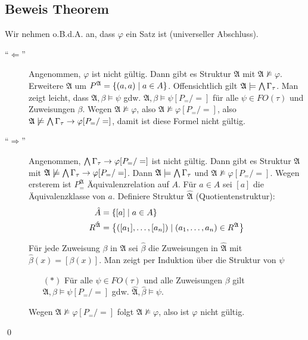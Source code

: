 \subsection{Beweis Theorem}

Wir nehmen o.B.d.A. an, dass $\varphi$ ein Satz ist (universeller Abschluss).

\begin{description}
  \item[\enquote{$\Leftarrow$}]
  Angenommen, $\varphi$ ist nicht gültig. Dann gibt es Struktur $\mathfrak{A}$ mit $\mathfrak{A}\not\models\varphi$.
  Erweitere $\mathfrak{A}$ um $P^\mathfrak{A} = \left\{(a,a)\mid a\in A\right\}$.
  Offensichtlich gilt $\mathfrak{A}\models\operatorname*{\bigwedge}\Gamma_\tau$. Man zeigt leicht, dass $\mathfrak{A},\beta\models\psi$ gdw. $\mathfrak{A},\beta\models\psi[P_=/=]$ für alle $\psi\in FO(\tau)$ und Zuweisungen $\beta$. Wegen $\mathfrak{A}\not\models\varphi$, also $\mathfrak{A}\not\models\varphi[P_=/=]$, also $\mathfrak{A}\not\models\operatorname*{\bigwedge}\Gamma_\tau \rightarrow \varphi[P_=/=]$, damit ist diese Formel nicht gültig.
  
  \item[\enquote{$\Rightarrow$}]
  Angenommen, $\operatorname*{\bigwedge}\Gamma_\tau \rightarrow \varphi[P_=/=]$ ist nicht gültig. Dann gibt es Struktur $\mathfrak{A}$ mit $\mathfrak{A}\not\models\operatorname*{\bigwedge}\Gamma_\tau\rightarrow\varphi[P_=/=]$. Dann $\mathfrak{A}\models\operatorname*{\bigwedge}\Gamma_\tau$ und $\mathfrak{A}\not\models\varphi[P_=/=]$. Wegen ersterem ist $P_=^\mathfrak{A}$ Äquivalenzrelation auf $A$. Für $a\in A$ sei $[a]$ die Äquivalenzklasse von $a$. Definiere Struktur $\hat{\mathfrak{A}}$ (Quotientenstruktur):
  \begin{align*}
    \hat{A} &= \left\{[a] \mid a\in A\right\}\\
    R^{\hat{\mathfrak{A}}} &= \left\{([a_1],\dots,[a_n]) \mid (a_1,\dots,a_n) \in R^\mathfrak{A} \right\}\\
  \end{align*}
  
  Für jede Zuweisung $\beta$ in $\mathfrak{A}$ sei $\hat{\beta}$ die Zuweisungen in $\hat{\mathfrak{A}}$ mit $\hat{\beta}(x)=[\beta(x)]$. Man zeigt per Induktion über die Struktur von $\psi$
  \begin{itemize}
    \item[$(*)$] Für alle $\psi\in FO(\tau)$ und alle Zuweisungen $\beta$ gilt $\mathfrak{A},\beta\models\psi[P_=/=]$ gdw. $\hat{\mathfrak{A}},\hat{\beta}\models\psi$.
  \end{itemize}
  Wegen $\mathfrak{A}\not\models\varphi[P_=/=]$ folgt $\hat{\mathfrak{A}}\not\models\varphi$, also ist $\varphi$ nicht gültig.
\end{description}
\qed
